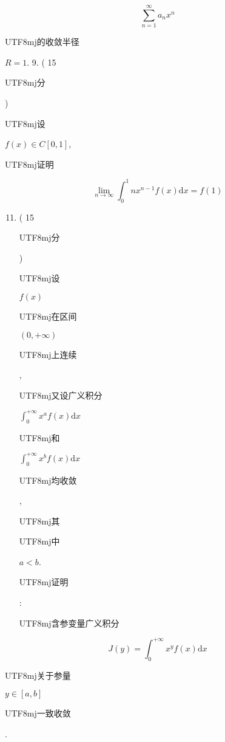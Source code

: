 \documentclass[10pt]{article}
\begin{document}
$$
\sum_{n=1}^{\infty} a_{n} x^{n}
$$
\begin{CJK}{UTF8}{mj}的收敛半径\end{CJK} $R=1$. 9. ( 15 \begin{CJK}{UTF8}{mj}分\end{CJK}) \begin{CJK}{UTF8}{mj}设\end{CJK} $f(x) \in C[0,1]$, \begin{CJK}{UTF8}{mj}证明\end{CJK}
$$
\lim _{n \rightarrow \infty} \int_{0}^{1} n x^{n-1} f(x) \mathrm{d} x=f(1)
$$

\begin{enumerate}
  \setcounter{enumi}{10}
  \item ( 15 \begin{CJK}{UTF8}{mj}分\end{CJK}) \begin{CJK}{UTF8}{mj}设\end{CJK} $f(x)$ \begin{CJK}{UTF8}{mj}在区间\end{CJK} $(0,+\infty)$ \begin{CJK}{UTF8}{mj}上连续\end{CJK}, \begin{CJK}{UTF8}{mj}又设广义积分\end{CJK} $\int_{0}^{+\infty} x^{a} f(x) \mathrm{d} x$ \begin{CJK}{UTF8}{mj}和\end{CJK} $\int_{0}^{+\infty} x^{b} f(x) \mathrm{d} x$ \begin{CJK}{UTF8}{mj}均收敛\end{CJK}, \begin{CJK}{UTF8}{mj}其\end{CJK} \begin{CJK}{UTF8}{mj}中\end{CJK} $a<b$. \begin{CJK}{UTF8}{mj}证明\end{CJK}: \begin{CJK}{UTF8}{mj}含参变量广义积分\end{CJK}
\end{enumerate}
$$
J(y)=\int_{0}^{+\infty} x^{y} f(x) \mathrm{d} x
$$
\begin{CJK}{UTF8}{mj}关于参量\end{CJK} $y \in[a, b]$ \begin{CJK}{UTF8}{mj}一致收敛\end{CJK}.
\end{document}
